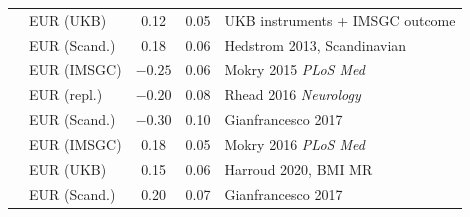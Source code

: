 \documentclass[11pt]{article}
\begin{document}
\begin{table}[h]
\begin{tabular}{@{}llccp{4.5cm}@{}}
& EUR (UKB) & 0.12 & 0.05 & UKB instruments + IMSGC outcome \\
& EUR (Scand.) & 0.18 & 0.06 & Hedstrom 2013, Scandinavian \\
\midrule
{}
& EUR (IMSGC) & $-0.25$ & 0.06 & Mokry 2015 \emph{PLoS Med} \\
& EUR (repl.) & $-0.20$ & 0.08 & Rhead 2016 \emph{Neurology} \\
& EUR (Scand.) & $-0.30$ & 0.10 & Gianfrancesco 2017 \\
\midrule
{}
& EUR (IMSGC) & 0.18 & 0.05 & Mokry 2016 \emph{PLoS Med} \\
& EUR (UKB) & 0.15 & 0.06 & Harroud 2020, BMI MR \\
& EUR (Scand.) & 0.20 & 0.07 & Gianfrancesco 2017 \\
\bottomrule
\end{tabular}
\end{table}
\end{document}
